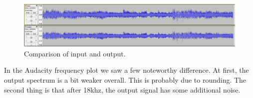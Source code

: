 \documentclass[a4paper,twoside,11pt, fleqn]{article}
\begin{document}
\begin{figure}[h]
	\includegraphics[scale = 0.40]{Images/simulationresults.png}
    \caption{Comparison of input and output.}
    \label{fig:compInOut}
\end{figure}

In the Audacity frequency plot we saw a few noteworthy difference. At first, the output spectrum is a bit weaker overall. This is probably due to rounding. The second thing is that after 18khz, the output signal has some additional noise. 
\end{document}

